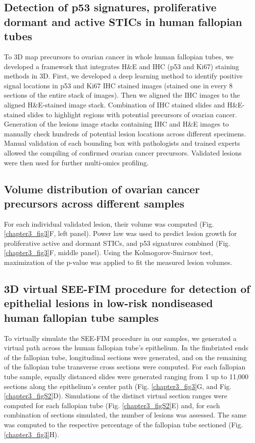 \begin{refsection}
    \subsection{Detection of p53 signatures, proliferative dormant and active STICs in human fallopian tubes}
    To 3D map precursors to ovarian cancer in whole human fallopian tubes, we developed a framework that integrates H\&E and IHC (p53 and Ki67) staining methods in 3D. First, we developed a deep learning method to identify positive signal locations in p53 and Ki67 IHC stained images (stained one in every 8 sections of the entire stack of images). Then we aligned the IHC images to the aligned H\&E-stained image stack. Combination of IHC stained slides and H\&E-stained slides to highlight regions with potential precursors of ovarian cancer. Generation of the lesions image stacks containing IHC and H\&E images to manually check hundreds of potential lesion locations across different specimens. Manual validation of each bounding box with pathologists and trained experts allowed the compiling of confirmed ovarian cancer precursors. Validated lesions were then used for further multi-omics profiling.
    
    \subsection{Volume distribution of ovarian cancer precursors across different samples}
    For each individual validated lesion, their volume was computed (Fig.\ref{chapter3_fig3}F, left panel). Power law was used to predict lesion growth for proliferative active and  dormant STICs, and p53 signatures combined (Fig. \ref{chapter3_fig3}F, middle panel)\cite{Power}. Using the Kolmogorov-Smirnov test, maximization of the p-value was applied to fit the measured lesion volumes\cite{Massey1951Kolmogorov}.
    
    \subsection{3D virtual SEE-FIM procedure for detection of epithelial lesions in low-risk nondiseased human fallopian tube samples}
    To virtually simulate the SEE-FIM procedure in our samples, we generated a virtual path across the human fallopian tube’s epithelium. In the fimbriated ends of the fallopian tube, longitudinal sections were generated, and on the remaining of the fallopian tube transverse cross sections were computed. For each fallopian tube sample, equally distanced slides were generated ranging from 1 up to 11,000 sections along the epithelium’s center path (Fig. \ref{chapter3_fig3}G, and Fig. \ref{chapter3_figS2}D). Simulations of the distinct virtual section ranges were computed for each fallopian tube (Fig. \ref{chapter3_figS2}E) and, for each combination of sections simulated, the number of lesions was assessed. The same was computed to the respective percentage of the fallopian tube sectioned (Fig. \ref{chapter3_fig3}H).
    

\end{refsection}
